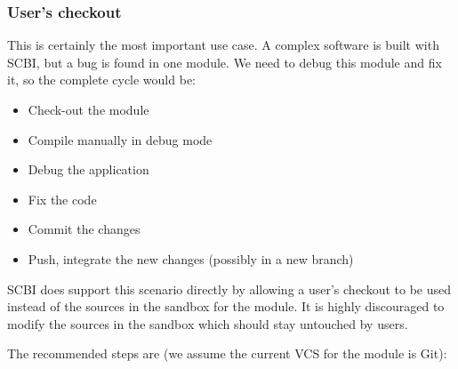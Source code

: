 \documentclass[a4paper,12pt,twoside]{article}
\begin{document}
\subsubsection{User's checkout}
\label{userco}

This is certainly the most important use case. A complex software is built with SCBI, but a bug is found in one module. We need to debug this module and fix it, so the complete cycle would be:

\begin{itemize}
	\item Check-out the module
	\item Compile manually in debug mode
	\item Debug the application
	\item Fix the code
	\item Commit the changes
	\item Push, integrate the new changes (possibly in a new branch)
\end{itemize}

SCBI does support this scenario directly by allowing a user's checkout to be used instead of the sources in the sandbox for the module. It is highly discouraged to modify the sources in the sandbox which should stay untouched by users.

The recommended steps are (we assume the current VCS for the module is Git):
\end{document}
